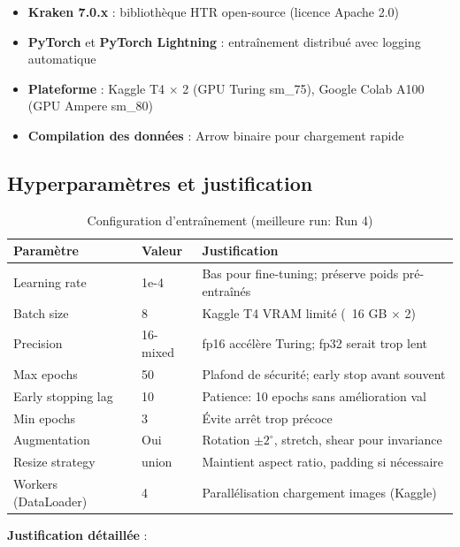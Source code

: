 ﻿\documentclass[twoside,twocolumn,10pt]{article}
\begin{document}
\begin{itemize}
  \item \textbf{Kraken 7.0.x} \cite{kiessling2019kraken} : bibliothèque HTR open-source (licence Apache 2.0)
  \item \textbf{PyTorch} \cite{pytorch2019} et \textbf{PyTorch Lightning} \cite{pytorchlightning2019} : entraînement distribué avec logging automatique
  \item \textbf{Plateforme} : Kaggle T4 $\times$ 2 (GPU Turing sm\_75), Google Colab A100 (GPU Ampere sm\_80)
  \item \textbf{Compilation des données} : Arrow binaire pour chargement rapide
\end{itemize}

\subsection{Hyperparamètres et justification}

\begin{table}[!htbp]
\fontsize{10}{11}\selectfont
\centering
\caption{Configuration d'entraînement (meilleure run: Run 4)}
\begin{tabular}{L{2cm}C{1.2cm}L{5cm}}
\toprule
Paramètre & Valeur & Justification \\
\midrule
Learning rate & 1e-4 & Bas pour fine-tuning; préserve poids pré-entraînés \\
Batch size & 8 & Kaggle T4 VRAM limité (~16 GB $\times$ 2) \\
Precision & 16-mixed & fp16 accélère Turing; fp32 serait trop lent \\
Max epochs & 50 & Plafond de sécurité; early stop avant souvent \\
Early stopping lag & 10 & Patience: 10 epochs sans amélioration val \\
Min epochs & 3 & Évite arrêt trop précoce \\
Augmentation & Oui & Rotation $\pm 2^{\circ}$, stretch, shear pour invariance \\
Resize strategy & union & Maintient aspect ratio, padding si nécessaire \\
Workers (DataLoader) & 4 & Parallélisation chargement images (Kaggle) \\
\bottomrule
\end{tabular}
\end{table}

\textbf{Justification détaillée} :
\end{document}
